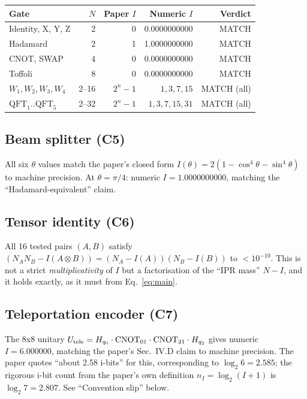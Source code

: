 \documentclass[11pt]{article}
\begin{document}
\begin{center}\small
\begin{tabular}{lrrrr}
\toprule
Gate & $N$ & Paper $I$ & Numeric $I$ & Verdict \\
\midrule
Identity, X, Y, Z         & 2  & 0        & 0.0000000000 & MATCH \\
Hadamard                  & 2  & 1        & 1.0000000000 & MATCH \\
CNOT, SWAP                & 4  & 0        & 0.0000000000 & MATCH \\
Toffoli                   & 8  & 0        & 0.0000000000 & MATCH \\
$W_1, W_2, W_3, W_4$      & 2--16 & $2^n-1$ & $1, 3, 7, 15$ & MATCH (all) \\
$\text{QFT}_1..\text{QFT}_5$ & 2--32 & $2^n-1$ & $1, 3, 7, 15, 31$ & MATCH (all) \\
\bottomrule
\end{tabular}
\end{center}

\subsection{Beam splitter (C5)}

All six $\theta$ values match the paper's closed form
$I(\theta) = 2(1-\cos^4\theta-\sin^4\theta)$ to machine precision.
At $\theta=\pi/4$: numeric $I = 1.0000000000$, matching the ``Hadamard-equivalent'' claim.

\subsection{Tensor identity (C6)}

All 16 tested pairs $(A,B)$ satisfy $(N_A N_B - I(A\otimes B)) = (N_A-I(A))(N_B-I(B))$
to $< 10^{-10}$. This is not a strict \emph{multiplicativity} of $I$ but a
factorisation of the ``IPR mass'' $N - I$, and it holds exactly, as it must
from Eq.~\ref{eq:main}.

\subsection{Teleportation encoder (C7)}

The 8x8 unitary $U_{\rm tele} = H_{q_0} \cdot {\rm CNOT}_{01} \cdot {\rm CNOT}_{21} \cdot H_{q_2}$
gives numeric $I = 6.000000$, matching the paper's Sec.~IV.D claim to machine
precision. The paper quotes ``about 2.58 i-bits'' for this, corresponding to
$\log_2 6 = 2.585$; the rigorous i-bit count from the paper's own definition
$n_I = \log_2(I+1)$ is $\log_2 7 = 2.807$. See ``Convention slip'' below.
\end{document}
